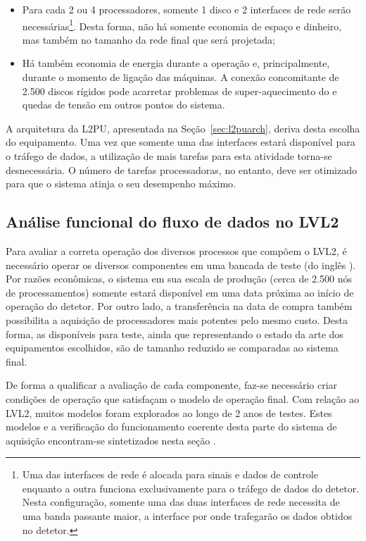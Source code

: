 \begin{itemize}
\item Para cada 2 ou 4 processadores, somente 1 disco e 2 interfaces de rede
serão necessárias\footnote{Uma das interfaces de rede é alocada para sinais e
dados de controle enquanto a outra funciona exclusivamente para o tráfego de
dados do detetor. Nesta configuração, somente uma das duas interfaces de rede
necessita de uma banda passante maior, a interface por onde trafegarão os
dados obtidos no detetor.}. Desta forma, não há somente economia de espaço e
dinheiro, mas também no tamanho da rede final que será projetada;

\item Há também economia de energia durante a operação e, principalmente,
durante o momento de ligação das máquinas. A conexão concomitante de 2.500
discos rígidos pode acarretar problemas de super-aquecimento do 
e quedas de tensão em outros pontos do sistema.
\end{itemize}

A arquitetura da L2PU, apresentada na Seção~\ref{sec:l2puarch}, deriva desta
escolha do equipamento. Uma vez que somente uma das interfaces estará
disponível para o tráfego de dados, a utilização de mais tarefas para esta
atividade torna-se desnecessária. O número de tarefas processadoras, no
entanto, deve ser otimizado para que o sistema atinja o seu desempenho máximo.

\subsection{Análise funcional do fluxo de dados no LVL2}
\label{sec:lvl2work}

Para avaliar a correta operação dos diversos processos que compõem o LVL2, é
necessário operar os diversos componentes em uma bancada de teste (do inglês
). Por razões econômicas, o sistema em sua escala de produção
(cerca de 2.500 nós de processamentos) somente estará disponível em uma data
próxima ao início de operação do detetor. Por outro lado, a transferência na
data de compra também possibilita a aquisição de processadores mais potentes
pelo mesmo custo. Desta forma, as  disponíveis para teste, ainda
que representando o estado da arte dos equipamentos escolhidos, são de tamanho
reduzido se comparadas ao sistema final.

De forma a qualificar a avaliação de cada componente, faz-se necessário criar
condições de operação que satisfaçam o modelo de operação final. Com relação
ao LVL2, muitos modelos foram explorados \cite{aa:tns-2004} ao longo de 2 anos
de testes. Estes modelos e a verificação do funcionamento coerente desta parte
do sistema de aquisição encontram-se sintetizados nesta seção \cite{hlt-tdr}.

